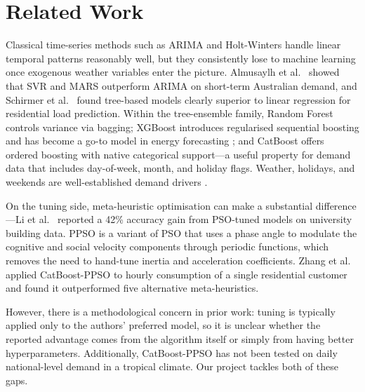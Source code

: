\section{Related Work}\label{sec:related}

Classical time-series methods such as ARIMA and Holt-Winters handle linear temporal patterns reasonably well, but they consistently lose to machine learning once exogenous weather variables enter the picture. Almusaylh et al.\ \parencite{almusaylh2018forecasting} showed that SVR and MARS outperform ARIMA on short-term Australian demand, and Schirmer et al.\ \parencite{schirmer2019evaluation} found tree-based models clearly superior to linear regression for residential load prediction. Within the tree-ensemble family, Random Forest \parencite{breiman2001randomforest} controls variance via bagging; XGBoost \parencite{chen2016xgboost} introduces regularised sequential boosting and has become a go-to model in energy forecasting \parencite{khan2020hybrid}; and CatBoost \parencite{prokhorenkova2018catboost} offers ordered boosting with native categorical support---a useful property for demand data that includes day-of-week, month, and holiday flags. Weather, holidays, and weekends are well-established demand drivers \parencite{khan2021influencing}.

On the tuning side, meta-heuristic optimisation can make a substantial difference---Li et al.\ \parencite{li2020datadrivenstrategy} reported a 42\% accuracy gain from PSO-tuned models on university building data. PPSO \parencite{ghasemi2019ppso} is a variant of PSO that uses a phase angle to modulate the cognitive and social velocity components through periodic functions, which removes the need to hand-tune inertia and acceleration coefficients. Zhang et al.\ \parencite{zhang2023catboostppso} applied CatBoost-PPSO to hourly consumption of a single residential customer and found it outperformed five alternative meta-heuristics.

However, there is a methodological concern in prior work: tuning is typically applied only to the authors' preferred model, so it is unclear whether the reported advantage comes from the algorithm itself or simply from having better hyperparameters. Additionally, CatBoost-PPSO has not been tested on daily national-level demand in a tropical climate. Our project tackles both of these gaps.
